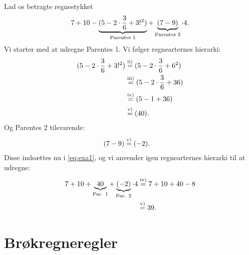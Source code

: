 \begin{exa}
Lad os betragte regnestykket
\begin{align}\label{eq:exa1}
7+10-\underbrace{(5-2\cdot \frac{3}{6}+3!^2)}_{\textnormal{Parentes 1}}+\underbrace{(7-9)}_{\textnormal{Parentes 2}}\cdot 4.
\end{align}
Vi starter med at udregne Parentes 1. Vi følger regnearternes hierarki:
\begin{align*}
(5-2\cdot \frac{3}{6}+3!^2) &\overset{\textnormal{ii)}}{=} (5-2\cdot \frac{3}{6}+6^2)\\
							&\overset{\textnormal{iii)}}{=} (5-2\cdot \frac{3}{6}+36)\\
							&\overset{\textnormal{iv)}}{=} (5-1+36)\\
							&\overset{\textnormal{v)}}{=} (40).
\end{align*}
Og Parentes 2 tilsvarende:
\begin{align*}
(7-9) &\overset{\textnormal{v)}}{=} (-2).
\end{align*}
Disse indsættes nu i \eqref{eq:exa1}, og vi anvender igen regnearternes hierarki til at udregne:
\begin{align*}
7+10+\underbrace{40}_{\textnormal{Par. 1}} + \underbrace{(-2)}_{\textnormal{Par. 2}}\cdot 4 &\overset{\textnormal{iv)}}{=} 7+10+40 -8 \\
&\overset{\textnormal{v)}}{=} 39.
\end{align*}
\end{exa}


\section*{Brøkregneregler}

